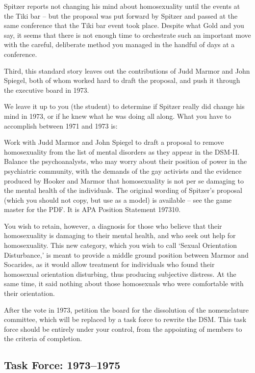\begin{refsection}
Spitzer reports not changing his mind about homosexuality until the events at the Tiki bar – but the proposal was put forward by Spitzer and passed at the same conference that the Tiki bar event took place. Despite what Gold and you say, it seems that there is not enough time to orchestrate such an important move with the careful, deliberate method you managed in the handful of days at a conference.

Third, this standard story leaves out the contributions of Judd Marmor and John Spiegel, both of whom worked hard to draft the proposal, and push it through the executive board in 1973. 

We leave it up to you (the student) to determine if Spitzer really did change his mind in 1973, or if he knew what he was doing all along. What you have to accomplish between 1971 and 1973 is:

Work with Judd Marmor and John Spiegel to draft a proposal to remove homosexuality from the list of mental disorders as they appear in the DSM-II. Balance the psychoanalysts, who may worry about their position of power in the psychiatric community, with the demands of the gay activists and the evidence produced by Hooker and Marmor that homosexuality is not per se damaging to the mental health of the individuals. The original wording of Spitzer's proposal (which you should not copy, but use as a model) is available – see the game master for the PDF. It is APA Position Statement 197310.

You wish to retain, however, a diagnosis for those who believe that their homosexuality is damaging to their mental health, and who seek out help for homosexuality. This new category, which you wish to call `Sexual Orientation Disturbance,' is meant to provide a middle ground position between Marmor and Socarides, as it would allow treatment for individuals who found their homosexual orientation disturbing, thus producing subjective distress. At the same time, it said nothing about those homosexuals who were comfortable with their orientation.

After the vote in 1973, petition the board for the dissolution of the nomenclature committee, which will be replaced by a task force to rewrite the DSM. This task force should be entirely under your control, from the appointing of members to the criteria of completion.

\subsection{Task Force: 1973--1975}
\label{taskforce:1973-1975}


\end{refsection}

